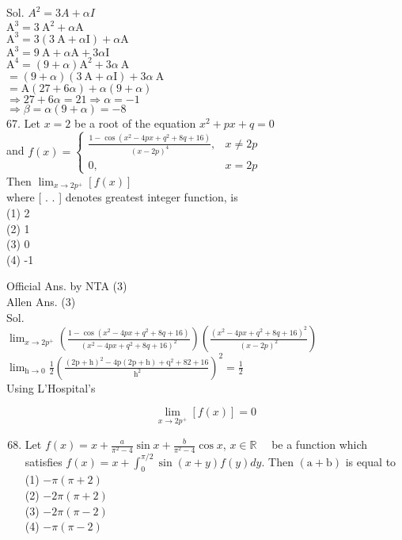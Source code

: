 \documentclass[10pt]{article}
\begin{document}
Sol. \(A^{2}=3 A+\alpha I\)\\
\(\mathrm{A}^{3}=3 \mathrm{~A}^{2}+\alpha \mathrm{A}\)\\
\(\mathrm{A}^{3}=3(3 \mathrm{~A}+\alpha \mathrm{I})+\alpha \mathrm{A}\)\\
\(\mathrm{A}^{3}=9 \mathrm{~A}+\alpha \mathrm{A}+3 \alpha \mathrm{I}\)\\
\(\mathrm{A}^{4}=(9+\alpha) \mathrm{A}^{2}+3 \alpha \mathrm{~A}\)\\
\(=(9+\alpha)(3 \mathrm{~A}+\alpha \mathrm{I})+3 \alpha \mathrm{~A}\)\\
\(=\mathrm{A}(27+6 \alpha)+\alpha(9+\alpha)\)\\
\(\Rightarrow 27+6 \alpha=21 \Rightarrow \alpha=-1\)\\
\(\Rightarrow \beta=\alpha(9+\alpha)=-8\)\\
67. Let \(x=2\) be a root of the equation \(x^{2}+p x+q=0\)\\
and \(f(x)=\left\{\begin{array}{cc}\frac{1-\cos \left(x^{2}-4 p x+q^{2}+8 q+16\right)}{(x-2 p)^{4}}, & x \neq 2 p \\ 0, & x=2 p\end{array}\right.\)\\
Then \(\lim _{x \rightarrow 2 p^{+}}[f(x)]\)\\[0pt]
where [ . . ] denotes greatest integer function, is\\
(1) 2\\
(2) 1\\
(3) 0\\
(4) -1

Official Ans. by NTA (3)\\
Allen Ans. (3)\\
Sol.\\
\(\lim _{x \rightarrow 2 p^{+}}\left(\frac{1-\cos \left(x^{2}-4 p x+q^{2}+8 q+16\right)}{\left(x^{2}-4 p x+q^{2}+8 q+16\right)^{2}}\right)\left(\frac{\left(x^{2}-4 p x+q^{2}+8 q+16\right)^{2}}{(x-2 p)^{2}}\right)\)\\
\(\lim _{\mathrm{h} \rightarrow 0} \frac{1}{2}\left(\frac{(2 \mathrm{p}+\mathrm{h})^{2}-4 \mathrm{p}(2 \mathrm{p}+\mathrm{h})+\mathrm{q}^{2}+82+16}{\mathrm{~h}^{2}}\right)^{2}=\frac{1}{2}\)\\
Using L'Hospital's

\[
\lim _{x \rightarrow 2 p^{+}}[f(x)]=0
\]

\begin{enumerate}
  \setcounter{enumi}{67}
  \item Let \(f(x)=x+\frac{a}{\pi^{2}-4} \sin x+\frac{b}{\pi^{2}-4} \cos x\), \(x \in \mathbb{R} \quad\) be a function which satisfies \(f(x)=x+\int_{0}^{\pi / 2} \sin (x+y) f(y) d y\). Then \((\mathrm{a}+\mathrm{b})\) is equal to\\
(1) \(-\pi(\pi+2)\)\\
(2) \(-2 \pi(\pi+2)\)\\
(3) \(-2 \pi(\pi-2)\)\\
(4) \(-\pi(\pi-2)\)
\end{enumerate}
\end{document}
